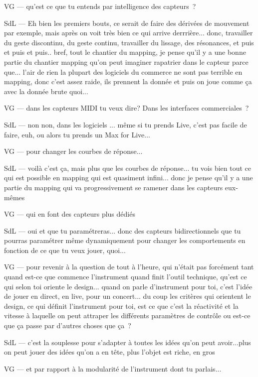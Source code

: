 VG — qu'est ce que tu entends par intelligence des capteurs ? 

SdL — Eh bien les premiers bouts, ce serait de faire des dérivées de mouvement par exemple, mais après on voit très bien ce qui arrive derrrière... donc, travailler du geste discontinu, du geste continu, travailler du lissage, des résonances, et puis et puis et puis.. bref, tout le chantier du mapping, je pense qu'il y a une bonne partie du chantier mapping qu'on peut imaginer rapatrier dans le capteur parce que... l'air de rien la plupart des logiciels du commerce ne sont pas terrible en mapping, donc c'est assez raide, ils prennent la donnée et puis on joue comme ça avec la donnée brute quoi... 

VG — dans les capteurs MIDI tu veux dire? Dans les interfaces commerciales ? 

SdL — non non, dans les logiciels ... même si tu prends Live, c'est pas facile de faire, euh, ou alors tu prends un Max for Live... 

VG — pour changer les courbes de réponse... 

SdL — voilà c'est ça, mais plus que les courbes de réponse... tu vois bien tout ce qui est possible en mapping qui est quasiment infini... donc je pense qu'il y a une partie du mapping qui va progressivement se ramener dans les capteurs eux-mêmes 

VG — qui en font des capteurs plus dédiés 

SdL — oui et que tu paramétreras... donc des capteurs bidirectionnels que tu pourras paramétrer même dynamiquement pour changer les comportements en fonction de ce que tu veux jouer, quoi... 

VG — pour revenir à la question de tout à l'heure, qui n'était pas forcément tant quand est-ce que commence l'instrument quand finit l'outil technique, qu'est ce qui selon toi oriente le design... quand on parle d'instrument pour toi, c'est l'idée de jouer en direct, en live, pour un concert... du coup les critères qui orientent le design, ce qui définit l'instrument pour toi, est ce que c'est la réactivité et la vitesse à laquelle on peut attraper les différents paramètres de contrôle ou est-ce que ça passe par d'autres choses que ça ? 

SdL — c'est la souplesse pour s'adapter à toutes les idées qu'on peut avoir...plus on peut jouer des idées qu'on a en tête, plus l'objet est riche, en gros 

VG — et par rapport à la modularité de l'instrument dont tu parlais... 

